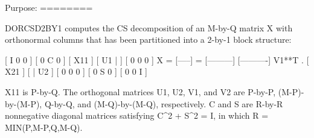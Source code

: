 \begin{DoxyVerb} Purpose:
 ========

 DORCSD2BY1 computes the CS decomposition of an M-by-Q matrix X with
 orthonormal columns that has been partitioned into a 2-by-1 block
 structure:

                                [  I  0  0 ]
                                [  0  C  0 ]
          [ X11 ]   [ U1 |    ] [  0  0  0 ]
      X = [-----] = [---------] [----------] V1**T .
          [ X21 ]   [    | U2 ] [  0  0  0 ]
                                [  0  S  0 ]
                                [  0  0  I ]
 
 X11 is P-by-Q. The orthogonal matrices U1, U2, V1, and V2 are P-by-P,
 (M-P)-by-(M-P), Q-by-Q, and (M-Q)-by-(M-Q), respectively. C and S are
 R-by-R nonnegative diagonal matrices satisfying C^2 + S^2 = I, in
 which R = MIN(P,M-P,Q,M-Q).\end{DoxyVerb}
 
